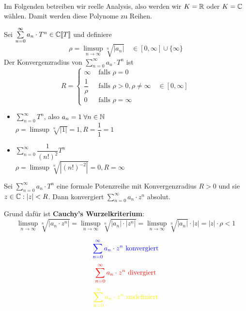 \documentclass[main.tex]{subfiles}
\begin{document}
\begin{Bemerkung}
  Im Folgenden betreiben wir reelle Analysis, also werden wir $K = \mathbb{R}$ oder $K = \mathbb{C}$ wählen. Damit werden diese Polynome zu Reihen.
\end{Bemerkung}

\begin{Definition}[Konvergenzradius]
  Sei $\sum \limits_{n=0}^\infty a_n \cdot T^n \in \mathbb{C}[\![T]\!]$ und definiere
  $$\rho = \limsup_{n\to \infty} \sqrt[n]{|a_n|} \quad \in [0,\infty]\cup \{\infty\}$$
  Der Konvergenzradius von $\sum \limits_{n=0}^\infty a_n \cdot T^n$ ist
  $$R = \left\{ \begin{aligned}
    \infty & \text{ falls } \rho = 0 \\
    \dfrac{1}{\rho} & \text{ falls } \rho > 0, \rho \neq \infty \quad \in  [0,\infty]\\
    0 & \text{ falls } \rho = \infty
  \end{aligned}\right.$$
\end{Definition}

\begin{Beispiel}
  \begin{itemize}
    \item $\sum \limits_{n=0}^\infty T^n$, also $a_n = 1 \;\forall n \in \mathbb{N}$\\
      $\rho = \limsup \sqrt[n]{|1|} = 1, R = \dfrac{1}{1} = 1$
    \item $\sum \limits_{n=0}^\infty \dfrac{1}{(n!)^2} T^n$\\
      $\rho = \limsup \sqrt[n]{|(n!)^{-2}|} = 0, R = \infty$
  \end{itemize}
\end{Beispiel}

\begin{Bemerkung}
  \begin{Theorem}
    Sei $\sum \limits_{n=0}^\infty a_n \cdot T^n$ eine formale Potenzreihe mit Konvergenzradius $R > 0$ und sie $z \in \mathbb{C} : |z| < R$. Dann konvergiert $\sum \limits_{n=0}^\infty a_n \cdot z^n$ absolut.
  \end{Theorem}
  \begin{Beweis}
    Grund dafür ist \textbf{Cauchy's Wurzelkriterium}:
    $$\limsup_{n\to\infty} \sqrt[n]{|a_n \cdot z^n|} = \limsup_{n\to\infty} \sqrt[n]{|a_n| \cdot |z^n|} = \limsup_{n\to\infty} \sqrt[n]{|a_n|} \cdot |z| = |z| \cdot \rho < 1$$
  \end{Beweis}
  \begin{minipage}{0.5\textwidth}
  \end{minipage}
  \begin{minipage}{0.5\textwidth}
    $$\color{blue} \sum \limits_{n=0}^\infty a_n \cdot z^n \text{ konvergiert}$$
    $$\color{red} \sum \limits_{n=0}^\infty a_n \cdot z^n \text{ divergiert}$$
    $$\color{yellow} \sum \limits_{n=0}^\infty a_n \cdot z^n \text{ undefiniert}$$
  \end{minipage}
\end{Bemerkung}
\end{document}
